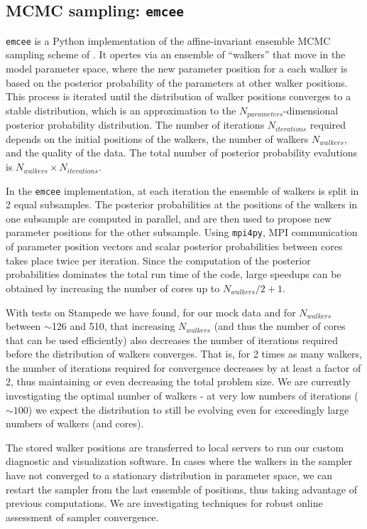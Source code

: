 \documentclass[11pt,preprint]{aastex}
\begin{document}
\subsection{MCMC sampling: \texttt{emcee}}
\label{sec:emcee}
\texttt{emcee} is a Python implementation of the affine-invariant ensemble MCMC sampling scheme of \cite{goodman_weare}.  It opertes via an ensemble of ``walkers'' that move in the model parameter space, where the new parameter position for a each walker is based on the posterior probability of the parameters at other walker positions.   This process is iterated until the distribution of walker positions converges to a stable distribution, which is an approximation to the $N_{parameters}$-dimensional posterior probability distribution. The number of iterations $N_{iterations}$ required depends on the initial positions of the walkers, the number of walkers $N_{walkers}$, and the quality of the data.  The total number of posterior probability evalutions is $N_{walkers} \times N_{iterations}$.

In the \texttt{emcee} implementation, at each iteration the ensemble of walkers is split in 2 equal subsamples. The posterior probabilities at the positions of the walkers in one subsample are computed in parallel, and are then used to propose new parameter positions for the other subsample. Using \texttt{mpi4py}, MPI communication of parameter position vectors and scalar posterior probabilities between cores takes place twice per iteration. Since the computation of the posterior probabilities dominates the total run time of the code, large speedups can be obtained by increasing the number of cores up to $N_{walkers}/2 + 1$.  

With tests on Stampede we have found, for our mock data and for $N_{walkers}$ between $\sim$126 and 510, that increasing $N_{walkers}$ (and thus the number of cores that can be used efficiently) also decreases the number of iterations required before the distribution of walkers converges.  That is, for 2 times as many walkers, the number of iterations required for convergence decreases by at least a factor of 2, thus maintaining or even decreasing the total problem size.  We are currently investigating the optimal number of walkers - at very low numbers of iterations ($\sim 100$) we expect the distribution to still be evolving even for exceedingly large numbers of walkers (and cores).

The stored walker positions are transferred to local servers to run our custom diagnostic and visualization software.  
In cases where the walkers in the sampler have not converged to a stationary distribution in parameter space, we can restart the sampler from the last ensemble of positions, thus taking advantage of previous computations.  
We are investigating techniques for robust online assessment of sampler convergence.
\end{document}
